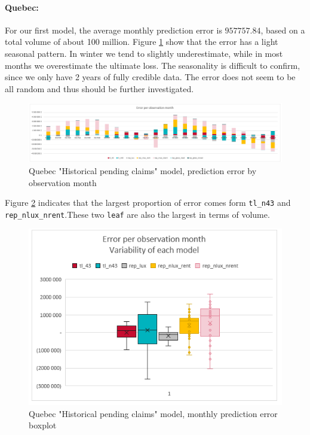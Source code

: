 	\paragraph{Quebec:}
		For our first model, the average monthly prediction error is $957 757.84$, based on a total volume of about 100 million. Figure \ref{Fig_QC_current_er_by_month} show that the error has a light seasonal pattern. In winter we tend to slightly underestimate, while in most months we overestimate the ultimate loss. The seasonality is difficult to confirm, since we only have 2 years of fully credible data. The error does not seem to be all random and thus should be further investigated.
		\begin{figure}[H]
			\begin{center}
				\includegraphics[scale=0.4]{Graphiques/QC_current_model_by_month} 
				\renewcommand{\figurename}{Figure}
				\caption{Quebec "Historical  pending claims" model, prediction error by observation month}\label{Fig_QC_current_er_by_month}
			\end{center}
		\end{figure}
		Figure \ref{Fig_QC_current_er_boxplot} indicates that the largest proportion of error comes form \texttt{tl\_n43} and \texttt{rep\_nlux\_nrent}.These two \texttt{leaf} are also the largest in terms of volume. 
		\begin{figure}[H]
			\begin{center}
				\includegraphics[scale=0.4]{Graphiques/QC_current_model_mustach} 
				\renewcommand{\figurename}{Figure}
				\caption{Quebec "Historical  pending claims" model, monthly prediction error boxplot}\label{Fig_QC_current_er_boxplot}
			\end{center}
		\end{figure}
	
